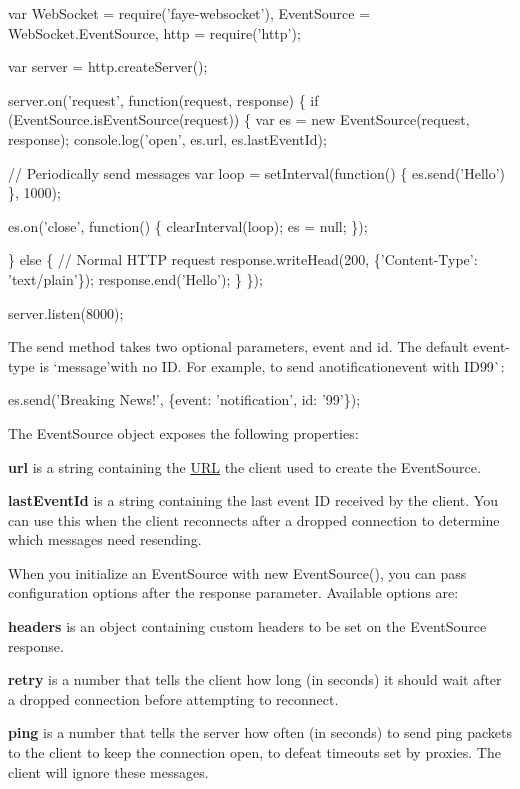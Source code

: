 \begin{DoxyCode}
var WebSocket   = require('faye-websocket'),
    EventSource = WebSocket.EventSource,
    http        = require('http');

var server = http.createServer();

server.on('request', function(request, response) \{
  if (EventSource.isEventSource(request)) \{
    var es = new EventSource(request, response);
    console.log('open', es.url, es.lastEventId);

    // Periodically send messages
    var loop = setInterval(function() \{ es.send('Hello') \}, 1000);

    es.on('close', function() \{
      clearInterval(loop);
      es = null;
    \});

  \} else \{
    // Normal HTTP request
    response.writeHead(200, \{'Content-Type': 'text/plain'\});
    response.end('Hello');
  \}
\});

server.listen(8000);
\end{DoxyCode}


The {\ttfamily send} method takes two optional parameters, {\ttfamily event} and {\ttfamily id}. The default event-\/type is `\textquotesingle{}message'{\ttfamily with no ID. For example, to send a}notification{\ttfamily  event with ID}99\`{}\+:


\begin{DoxyCode}
es.send('Breaking News!', \{event: 'notification', id: '99'\});
\end{DoxyCode}


The {\ttfamily Event\+Source} object exposes the following properties\+:


\begin{DoxyItemize}
\item {\bfseries {\ttfamily url}} is a string containing the \mbox{\hyperlink{namespace_u_r_l}{U\+RL}} the client used to create the Event\+Source.
\item {\bfseries {\ttfamily last\+Event\+Id}} is a string containing the last event ID received by the client. You can use this when the client reconnects after a dropped connection to determine which messages need resending.
\end{DoxyItemize}

When you initialize an Event\+Source with {\ttfamily new Event\+Source()}, you can pass configuration options after the {\ttfamily response} parameter. Available options are\+:


\begin{DoxyItemize}
\item {\bfseries {\ttfamily headers}} is an object containing custom headers to be set on the Event\+Source response.
\item {\bfseries {\ttfamily retry}} is a number that tells the client how long (in seconds) it should wait after a dropped connection before attempting to reconnect.
\item {\bfseries {\ttfamily ping}} is a number that tells the server how often (in seconds) to send \textquotesingle{}ping\textquotesingle{} packets to the client to keep the connection open, to defeat timeouts set by proxies. The client will ignore these messages.
\end{DoxyItemize}

